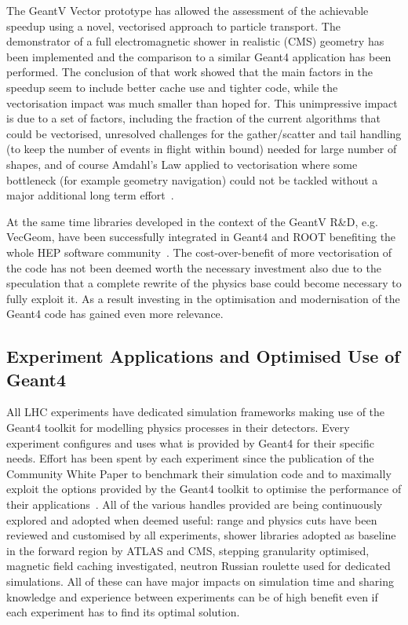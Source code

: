 The GeantV Vector prototype has allowed the assessment
of the achievable speedup using a novel, vectorised approach to particle
transport. The demonstrator of a full electromagnetic shower in
realistic (CMS) geometry has been implemented and the comparison to a
similar Geant4 application has been performed. The conclusion of that
work showed that the main factors in the speedup seem to include better
cache use and tighter code, while the vectorisation impact was much
smaller than hoped for. This unimpressive impact is due to a set of
factors, including the fraction of the current algorithms that could be
vectorised, unresolved challenges for the gather/scatter and tail
handling (to keep the number of events in flight within bound) needed
for large number of shapes, and of course Amdahl's Law applied to
vectorisation where some bottleneck (for example geometry navigation)
could not be tackled without a major additional long term effort~\cite{GeantV-2019, GeantV-2020}.

At the same time libraries developed in the context of the
GeantV R\&D, e.g. VecGeom, have been successfully integrated in Geant4
and ROOT benefiting the whole HEP software community~\cite{CMS01}. The
cost-over-benefit of more vectorisation of the code has not been deemed
worth the necessary investment also due to the speculation that a
complete rewrite of the physics base could become necessary to fully
exploit it. As a result investing in the optimisation and modernisation
of the Geant4 code has gained even more relevance.

\hypertarget{experiments-applications-and-optimisation-of-the-use-of-geant4}{%
\subsection{Experiment Applications and Optimised Use of
Geant4}\label{experiments-applications-and-optimisation-of-the-use-of-geant4}}

All LHC experiments have dedicated simulation frameworks making use of
the Geant4 toolkit for modelling physics processes in their detectors. Every experiment
configures and uses what is provided by Geant4 for their specific needs.
Effort has been spent by each experiment since the publication of the
Community White Paper to benchmark their 
simulation code and to maximally
exploit the options provided by the Geant4 toolkit to optimise the
performance of their applications~\cite{ATLAS-G4OPT}. All of the various handles provided
are being continuously explored and adopted when deemed useful: range
and physics cuts have been reviewed and customised by all experiments,
shower libraries adopted as baseline in the forward region by ATLAS and
CMS, stepping granularity optimised, magnetic field caching
investigated, neutron Russian roulette used for dedicated simulations.
All of these can have major impacts on simulation time and sharing
knowledge and experience between experiments can be of high benefit even
if each experiment has to find its optimal solution.

